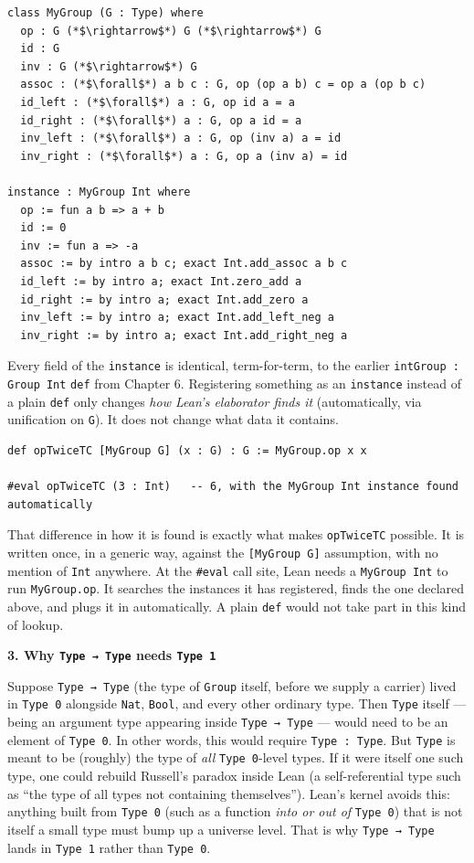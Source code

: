 \begin{lstlisting}
class MyGroup (G : Type) where
  op : G (*$\rightarrow$*) G (*$\rightarrow$*) G
  id : G
  inv : G (*$\rightarrow$*) G
  assoc : (*$\forall$*) a b c : G, op (op a b) c = op a (op b c)
  id_left : (*$\forall$*) a : G, op id a = a
  id_right : (*$\forall$*) a : G, op a id = a
  inv_left : (*$\forall$*) a : G, op (inv a) a = id
  inv_right : (*$\forall$*) a : G, op a (inv a) = id

instance : MyGroup Int where
  op := fun a b => a + b
  id := 0
  inv := fun a => -a
  assoc := by intro a b c; exact Int.add_assoc a b c
  id_left := by intro a; exact Int.zero_add a
  id_right := by intro a; exact Int.add_zero a
  inv_left := by intro a; exact Int.add_left_neg a
  inv_right := by intro a; exact Int.add_right_neg a
\end{lstlisting}

Every field of the \texttt{instance} is identical, term-for-term, to the earlier \texttt{intGroup : Group Int} \texttt{def} from Chapter 6. Registering something as an \texttt{instance} instead of a plain \texttt{def} only changes \emph{how Lean's elaborator finds it} (automatically, via unification on \texttt{G}). It does not change what data it contains.

\begin{lstlisting}
def opTwiceTC [MyGroup G] (x : G) : G := MyGroup.op x x

#eval opTwiceTC (3 : Int)   -- 6, with the MyGroup Int instance found automatically
\end{lstlisting}

That difference in how it is found is exactly what makes \texttt{opTwiceTC} possible. It is written once, in a generic way, against the \texttt{[MyGroup G]} assumption, with no mention of \texttt{Int} anywhere. At the \texttt{\#eval} call site, Lean needs a \texttt{MyGroup Int} to run \texttt{MyGroup.op}. It searches the instances it has registered, finds the one declared above, and plugs it in automatically. A plain \texttt{def} would not take part in this kind of lookup.

\textbf{3. Why \texttt{Type → Type} needs \texttt{Type 1}}

Suppose \texttt{Type → Type} (the type of \texttt{Group} itself, before we supply a carrier) lived in \texttt{Type 0} alongside \texttt{Nat}, \texttt{Bool}, and every other ordinary type. Then \texttt{Type} itself --- being an argument type appearing inside \texttt{Type → Type} --- would need to be an element of \texttt{Type 0}. In other words, this would require \texttt{Type : Type}. But \texttt{Type} is meant to be (roughly) the type of \emph{all} \texttt{Type 0}-level types. If it were itself one such type, one could rebuild Russell's paradox inside Lean (a self-referential type such as ``the type of all types not containing themselves''). Lean's kernel avoids this: anything built from \texttt{Type 0} (such as a function \emph{into or out of} \texttt{Type 0}) that is not itself a small type must bump up a universe level. That is why \texttt{Type → Type} lands in \texttt{Type 1} rather than \texttt{Type 0}.

